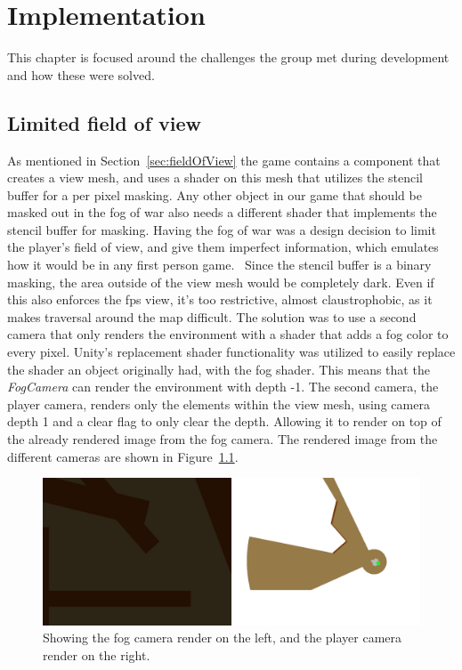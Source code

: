 \chapter{Implementation}
\label{chap:implementation}
This chapter is focused around the challenges the group met during development and how these were solved.  

\section{Limited field of view}
As mentioned in Section~\ref{sec:fieldOfView} the game contains a component that creates a view mesh, and uses a shader on this mesh that utilizes the stencil buffer for a per pixel masking. Any other object in our game that should be masked out in the fog of war also needs a different shader that implements the stencil buffer for masking. Having the fog of war was a design decision to limit the player's field of view, and give them imperfect information, which emulates how it would be in any first person game.~\cite{gameDesignTheory}
Since the stencil buffer is a binary masking, the area outside of the view mesh would be completely dark. Even if this also enforces the fps view, it's too restrictive, almost claustrophobic, as it makes traversal around the map difficult. The solution was to use a second camera that only renders the environment with a shader that adds a fog color to every pixel. Unity's replacement shader functionality was utilized to easily replace the shader an object originally had, with the fog shader. This means that the \emph{FogCamera} can render the environment with depth -1. The second camera, the player camera, renders only the elements within the view mesh, using camera depth 1 and a clear flag to only clear the depth. Allowing it to render on top of the already rendered image from the fog camera. The rendered image from the different cameras are shown in Figure~\ref{fig:cameraRenders}.

\begin{figure}[htbp]  %
  \centering
  \includegraphics[width=.8\textwidth]{images/CameraRenders}
  \caption[Rendered image from the two cameras]{Showing the fog camera render on the left, and the player camera render on the right.}
  \label{fig:cameraRenders}
\end{figure}

